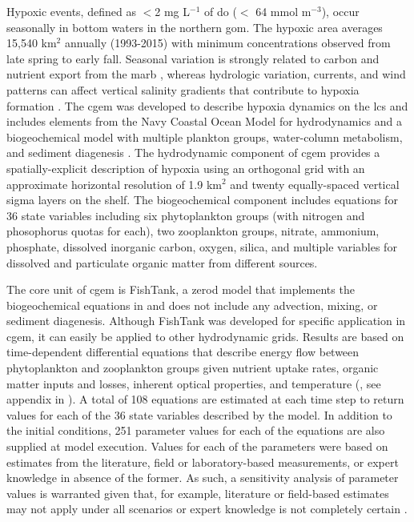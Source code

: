 \documentclass[preprint]{elsarticle}\usepackage[]{graphicx}\usepackage[]{color}
\begin{document}
Hypoxic events, defined  as $<$2 mg L$^{-1}$ of \ac{do} ($<$ 64 mmol m$^{-3}$), occur seasonally in bottom waters in the northern \ac{gom}.  The hypoxic area averages 15,540 km$^2$ annually (1993-2015) with minimum concentrations observed from late spring to early fall.  Seasonal variation is strongly related to carbon and nutrient export from the \ac{marb} \citep{Lohrenz08,Bianchi10}, whereas hydrologic variation, currents, and wind patterns can affect vertical salinity gradients that contribute to hypoxia formation \citep{Wiseman97,Paerl98,Obenour15}. The \ac{cgem} was developed to describe hypoxia dynamics on the \ac{lcs} and includes elements from the Navy Coastal Ocean Model \citep{Martin00} for hydrodynamics and a biogeochemical model with multiple plankton groups, water-column metabolism, and sediment diagenesis \citep{Eldridge10}.  The hydrodynamic component of \ac{cgem} provides a spatially-explicit description of hypoxia using an orthogonal grid with an approximate horizontal resolution of 1.9 km$^2$ and twenty equally-spaced vertical sigma layers on the shelf.  The biogeochemical component includes equations for 36 state variables including six phytoplankton groups (with nitrogen and phosophorus quotas for each), two zooplankton groups, nitrate, ammonium, phosphate, dissolved inorganic carbon, oxygen, silica, and multiple variables for dissolved and particulate organic matter from different sources.

The core unit of \ac{cgem} is FishTank, a \ac{zerod} model that implements the biogeochemical equations in \citet{Eldridge10} and does not include any advection, mixing, or sediment diagenesis. Although FishTank was developed for specific application in \ac{cgem}, it can easily be applied to other hydrodynamic grids. Results are based on time-dependent differential equations that describe energy flow between phytoplankton and zooplankton groups given nutrient uptake rates, organic matter inputs and losses, inherent optical properties, and temperature (\citealt{Penta08,Eldridge10}, see appendix in ). A total of 108 equations are estimated at each time step to return values for each of the 36 state variables described by the model.  In addition to the initial conditions, 251 parameter values for each of the equations are also supplied at model execution. Values for each of the parameters were based on estimates from the literature, field or laboratory-based measurements, or expert knowledge in absence of the former.  As such, a sensitivity analysis of parameter values is warranted given that, for example, literature or field-based estimates may not apply under all scenarios or expert knowledge is not completely certain \citep{Refsgaard07}.
\end{document}
